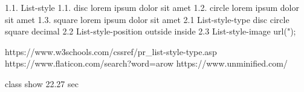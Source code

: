1.1. List-style
1.1. disc
        lorem
        ipsum
        dolor
        sit
        amet
1.2. circle
        lorem
        ipsum
        dolor
        sit
        amet
1.3. square
        lorem
        ipsum
        dolor
        sit
        amet
2.1 List-style-type
        disc
        circle
        square
        decimal
2.2 List-style-position
        outside
        inside
2.3 List-style-image
        url(");

        https://www.w3schools.com/cssref/pr_list-style-type.asp
        https://www.flaticon.com/search?word=arow
        https://www.unminified.com/

class show 22.27 sec